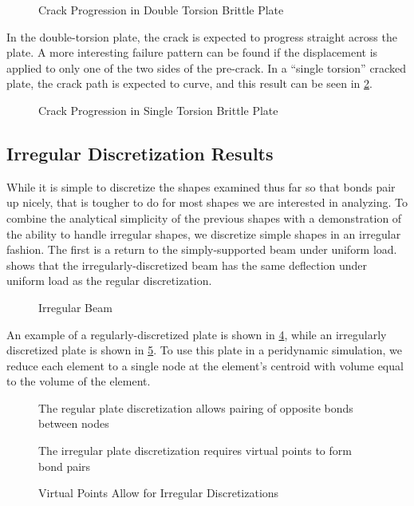 %
\begin{figure}[tbhp]
  \centering
  \resizebox{0.8\linewidth}{!}{}
  \caption{Crack Progression in Double Torsion Brittle Plate}
  \label{fig:DTdamage}
\end{figure}
%
In the double-torsion plate, the crack is expected to progress straight across the plate.
A more interesting failure pattern can be found if the displacement is applied to only one of the two sides of the pre-crack.
In a ``single torsion'' cracked plate, the crack path is expected to curve, and this result can be seen in \cref{fig:SingleTorsion}.
%
\begin{figure}[tbhp]
  \centering
  \resizebox{0.8\linewidth}{!}{}
  \caption{Crack Progression in Single Torsion Brittle Plate}
  \label{fig:SingleTorsion}
\end{figure}
%

\FloatBarrier
\subsection{Irregular Discretization Results}
While it is simple to discretize the shapes examined thus far so that bonds pair up nicely, that is tougher to do for most shapes we are interested in analyzing.
To combine the analytical simplicity of the previous shapes with a demonstration of the ability to handle irregular shapes, we discretize simple shapes in an irregular fashion.
The first is a return to the simply-supported beam under uniform load.
 shows that the irregularly-discretized beam has the same deflection under uniform load as the regular discretization.
%
\begin{figure}[tbhp]
  \centering
  \resizebox{0.6\linewidth}{!}{}
  \caption{Irregular Beam}
  \label{fig:BeamIrreg}
\end{figure}
%

An example of a regularly-discretized plate is shown in \cref{fig:regularmesh}, while an irregularly discretized plate is shown in \cref{fig:unevenmesh}.
To use this plate in a peridynamic simulation, we reduce each element to a single node at the element's centroid with volume equal to the volume of the element. 
%
\begin{figure}[h]
  \centering
  \resizebox{0.6\linewidth}{!}{}
  \caption[Regular Plate Discretization]{The regular plate discretization allows pairing of opposite bonds between nodes}
  \label{fig:regularmesh}
\end{figure}
%
\begin{figure}[tbhp]
  \centering
  \resizebox{0.6\linewidth}{!}{}
  \caption[Irregular Plate Discretization]{The irregular plate discretization requires virtual points to form bond pairs}
  \label{fig:unevenmesh}
\end{figure}
%
%
\begin{figure}[tbhp]
  \centering
  \resizebox{0.6\linewidth}{!}{}
  \caption{Virtual Points Allow for Irregular Discretizations}
  \label{fig:PlateIrreg}
\end{figure}
%

